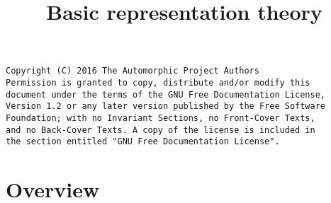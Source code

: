 

%

\newcommand{\TAG}{ZZZZ}

\title{Basic representation theory}


\maketitle

\label{section-phantom}
\hypertarget{0100}{}
\reversemarginpar{}

\begin{verbatim}
Copyright (C) 2016 The Automorphic Project Authors
Permission is granted to copy, distribute and/or modify this
document under the terms of the GNU Free Documentation License,
Version 1.2 or any later version published by the Free Software
Foundation; with no Invariant Sections, no Front-Cover Texts,
and no Back-Cover Texts. A copy of the license is included in
the section entitled "GNU Free Documentation License".
\end{verbatim}

\tableofcontents


\section{Overview}
\label{section-overview}
\hypertarget{0101}{}
\reversemarginpar{}








